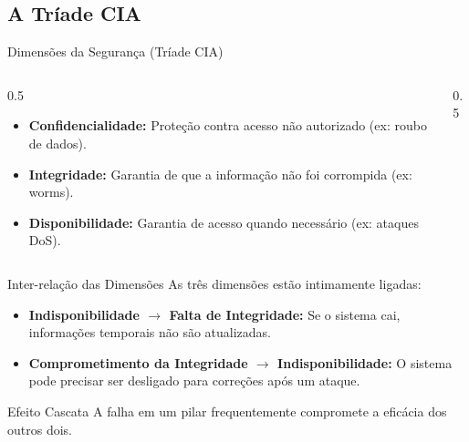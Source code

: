 \documentclass[aspectratio=169]{beamer}
\begin{document}
\subsection{A Tríade CIA}
\begin{frame}{Dimensões da Segurança (Tríade CIA)}
    \begin{columns}
        \begin{column}{0.5\textwidth}
            \begin{itemize}
                \item \textbf{Confidencialidade:} Proteção contra acesso não autorizado (ex: roubo de dados).
                \item \textbf{Integridade:} Garantia de que a informação não foi corrompida (ex: worms).
                \item \textbf{Disponibilidade:} Garantia de acesso quando necessário (ex: ataques DoS).
            \end{itemize}
        \end{column}
        \begin{column}{0.5\textwidth}
            \centering
        \end{column}
    \end{columns}
\end{frame}

\begin{frame}{Inter-relação das Dimensões}
    As três dimensões estão intimamente ligadas:
    \begin{itemize}
        \item \textbf{Indisponibilidade $\rightarrow$ Falta de Integridade:} Se o sistema cai, informações temporais não são atualizadas.
        \item \textbf{Comprometimento da Integridade $\rightarrow$ Indisponibilidade:} O sistema pode precisar ser desligado para correções após um ataque.
    \end{itemize}
    \begin{exampleblock}{Efeito Cascata}
        A falha em um pilar frequentemente compromete a eficácia dos outros dois.
    \end{exampleblock}
\end{frame}
\end{document}
